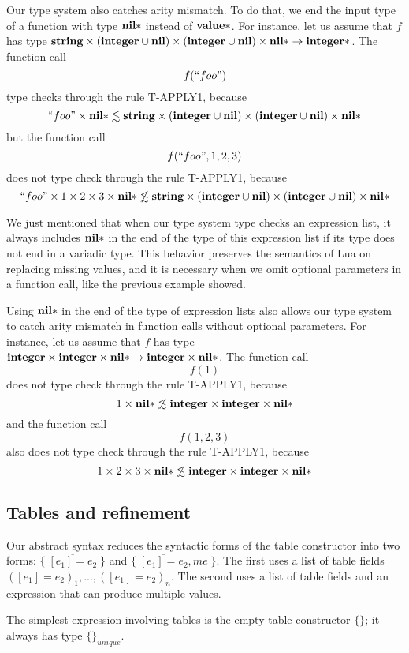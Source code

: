 Our type system also catches arity mismatch.
To do that, we end the input type of a function with type $\mathbf{nil}{*}$
instead of $\mathbf{value}{*}$.
For instance, let us assume that $f$ has type
$\mathbf{string} \times (\mathbf{integer} \cup \mathbf{nil}) \times (\mathbf{integer} \cup \mathbf{nil}) \times \mathbf{nil}{*} \rightarrow \mathbf{integer}{*}$.
The function call
\[
f(``foo")
\]
type checks through the rule \textsc{T-APPLY1}, because
\[
``foo" \times \mathbf{nil}{*} \lesssim \mathbf{string} \times (\mathbf{integer} \cup \mathbf{nil}) \times (\mathbf{integer} \cup \mathbf{nil}) \times \mathbf{nil}{*}
\]
but the function call
\[
f(``foo",1,2,3)
\]
does not type check through the rule \textsc{T-APPLY1}, because
\[
``foo" \times 1 \times 2 \times 3 \times \mathbf{nil}{*} \not\lesssim \mathbf{string} \times (\mathbf{integer} \cup \mathbf{nil}) \times (\mathbf{integer} \cup \mathbf{nil}) \times \mathbf{nil}{*}
\]

We just mentioned that when our type system type checks an expression list,
it always includes $\mathbf{nil}{*}$ in the end of the type of this expression list
if its type does not end in a variadic type.
This behavior preserves the semantics of Lua on replacing missing values,
and it is necessary when we omit optional parameters in a function call,
like the previous example showed.

Using $\mathbf{nil}{*}$ in the end of the type of expression lists also allows
our type system to catch arity mismatch in function calls without optional parameters.
For instance, let us assume that $f$ has type
$\mathbf{integer} \times \mathbf{integer} \times \mathbf{nil}{*} \rightarrow \mathbf{integer} \times \mathbf{nil}{*}$.
The function call
\[
f(1)
\]
does not type check through the rule \textsc{T-APPLY1}, because
\[
1 \times \mathbf{nil}{*} \not\lesssim \mathbf{integer} \times \mathbf{integer} \times \mathbf{nil}{*}
\]
and the function call
\[
f(1,2,3)
\]
also does not type check through the rule \textsc{T-APPLY1}, because
\[
1 \times 2 \times 3 \times \mathbf{nil}{*} \not\lesssim \mathbf{integer} \times \mathbf{integer} \times \mathbf{nil}{*}
\]

\subsection{Tables and refinement}
\label{sec:refinement}

Our abstract syntax reduces the syntactic forms of the table constructor
into two forms: $\{\;\overline{[e_{1}] = e_{2}}\;\}$ and
$\{\;\overline{[e_{1}] = e_{2}},me\;\}$.
The first uses a list of table fields $([e_{1}] = e_{2})_{1}, ..., ([e_{1}] = e_{2})_{n}$.
The second uses a list of table fields and an expression that can
produce multiple values.

The simplest expression involving tables is the empty table constructor $\{\}$;
it always has type $\{\}_{unique}$.

